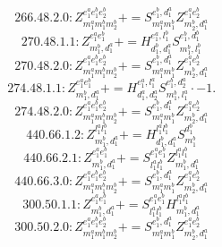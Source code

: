 \documentclass[letterpaper,10pt,fleqn,leqno,onecolumn]{article}
\begin{document}
\begin{equation} \;\;\;\;\;\;  266.48.2.0: Z^{e_{1}^{a}e_{1}^{b}e_{2}^{b}}_{m_{1}^{a}m_{1}^{b}m_{2}^{b}}+=S^{e_{1}^{b},d_{1}^{a}}_{m_{1}^{a}m_{1}^{b}}Z^{e_{1}^{a}e_{2}^{b}}_{m_{2}^{b},d_{1}^{a}} \end{equation}
\begin{equation} \;\;\;\;\;\;  270.48.1.1: Z^{e_{1}^{a}e_{1}^{b}}_{m_{1}^{b},d_{1}^{a}}+=H^{e_{1}^{a},l_{1}^{b}}_{d_{1}^{b},d_{1}^{a}}S^{e_{1}^{b},d_{1}^{b}}_{m_{1}^{b},l_{1}^{b}} \end{equation}
\begin{equation} \;\;\;\;\;\;  270.48.2.0: Z^{e_{1}^{a}e_{1}^{b}e_{2}^{b}}_{m_{1}^{a}m_{1}^{b}m_{2}^{b}}+=S^{e_{1}^{b},d_{1}^{a}}_{m_{1}^{a}m_{1}^{b}}Z^{e_{1}^{a}e_{2}^{b}}_{m_{2}^{b},d_{1}^{a}} \end{equation}
\begin{equation} \;\;\;\;\;\;  274.48.1.1: Z^{e_{1}^{a}e_{1}^{b}}_{m_{1}^{b},d_{1}^{a}}+=H^{e_{1}^{a},l_{1}^{a}}_{d_{1}^{a},d_{2}^{a}}S^{e_{1}^{b},d_{2}^{a}}_{m_{1}^{b},l_{1}^{a}}\cdot -1. \end{equation}
\begin{equation} \;\;\;\;\;\;  274.48.2.0: Z^{e_{1}^{a}e_{1}^{b}e_{2}^{b}}_{m_{1}^{a}m_{1}^{b}m_{2}^{b}}+=S^{e_{1}^{b},d_{1}^{a}}_{m_{1}^{a}m_{1}^{b}}Z^{e_{1}^{a}e_{2}^{b}}_{m_{2}^{b},d_{1}^{a}} \end{equation}
\begin{equation} \;\;\;\;\;\;  440.66.1.2: Z^{l_{1}^{a}l_{1}^{b}}_{m_{1}^{b},d_{1}^{a}}+=H^{l_{1}^{a}l_{1}^{b}}_{d_{1}^{b},d_{1}^{a}}S^{d_{1}^{b}}_{m_{1}^{b}} \end{equation}
\begin{equation} \;\;\;\;\;\;  440.66.2.1: Z^{e_{1}^{a}e_{1}^{b}}_{m_{1}^{b},d_{1}^{a}}+=S^{e_{1}^{a}e_{1}^{b}}_{l_{1}^{a}l_{1}^{b}}Z^{l_{1}^{a}l_{1}^{b}}_{m_{1}^{b},d_{1}^{a}} \end{equation}
\begin{equation} \;\;\;\;\;\;  440.66.3.0: Z^{e_{1}^{a}e_{1}^{b}e_{2}^{b}}_{m_{1}^{a}m_{1}^{b}m_{2}^{b}}+=S^{e_{1}^{b},d_{1}^{a}}_{m_{1}^{a}m_{1}^{b}}Z^{e_{1}^{a}e_{2}^{b}}_{m_{2}^{b},d_{1}^{a}} \end{equation}
\begin{equation} \;\;\;\;\;\;  300.50.1.1: Z^{e_{1}^{a}e_{1}^{b}}_{m_{1}^{b},d_{1}^{a}}+=S^{e_{1}^{a}e_{1}^{b}}_{l_{1}^{a}l_{1}^{b}}H^{l_{1}^{a}l_{1}^{b}}_{m_{1}^{b},d_{1}^{a}} \end{equation}
\begin{equation} \;\;\;\;\;\;  300.50.2.0: Z^{e_{1}^{a}e_{1}^{b}e_{2}^{b}}_{m_{1}^{a}m_{1}^{b}m_{2}^{b}}+=S^{e_{1}^{b},d_{1}^{a}}_{m_{1}^{a}m_{1}^{b}}Z^{e_{1}^{a}e_{2}^{b}}_{m_{2}^{b},d_{1}^{a}} \end{equation}
\end{document}
